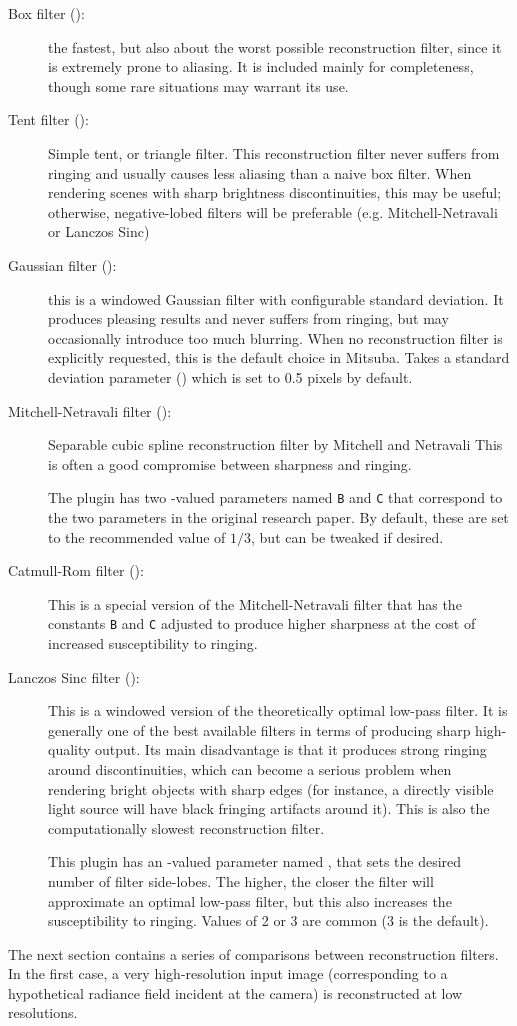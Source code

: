 \begin{description}
\item[Box filter ():]
the fastest, but also about the worst possible
reconstruction filter, since it is extremely prone to aliasing.
It is included mainly for completeness, though some rare situations
may warrant its use.
\item[Tent filter ():]
Simple tent, or triangle filter. This reconstruction filter never
suffers from ringing and usually causes less aliasing than a naive
box filter. When rendering scenes with sharp brightness discontinuities,
this may be useful; otherwise, negative-lobed filters will be preferable
(e.g. Mitchell-Netravali or Lanczos Sinc)

\item[Gaussian filter ():]
this is a windowed Gaussian filter with configurable standard deviation.
It produces pleasing results and never suffers from ringing, but may
occasionally introduce too much blurring.
When no reconstruction filter is explicitly requested, this is the default
choice in Mitsuba. Takes a standard deviation parameter ()
which is set to 0.5 pixels by default.
\item[Mitchell-Netravali filter ():]
Separable cubic spline reconstruction filter by Mitchell and Netravali
\cite{Mitchell:1988:Reconstruction}
This is often a good compromise between sharpness and ringing.

The plugin has two -valued parameters named \texttt{B} and \texttt{C} that
correspond to the two parameters in the original research paper. By default, these
are set to the recommended value of $1/3$, but can be tweaked if desired.

\item[Catmull-Rom filter ():]
This is a special version of the Mitchell-Netravali filter that has the
constants \texttt{B} and \texttt{C} adjusted to produce higher sharpness at the
cost of increased susceptibility to ringing.

\item[Lanczos Sinc filter ():]
This is a windowed version of the theoretically optimal low-pass filter.
It is generally one of the best available filters in terms of producing sharp
high-quality output. Its main disadvantage is that it produces strong ringing around
discontinuities, which can become a serious problem when rendering bright objects
with sharp edges (for instance, a directly visible light source will have black
fringing artifacts around it).
This is also the computationally slowest reconstruction filter.

This plugin has an -valued parameter named , that
sets the desired number of filter side-lobes. The higher, the closer
the filter will approximate an optimal low-pass filter, but this also
increases the susceptibility to ringing. Values of 2 or 3 are common (3 is the default).
\end{description}
The next section contains a series of comparisons between reconstruction filters. In the first
case, a very high-resolution input image (corresponding to a hypothetical radiance field
incident at the camera) is reconstructed at low resolutions.

